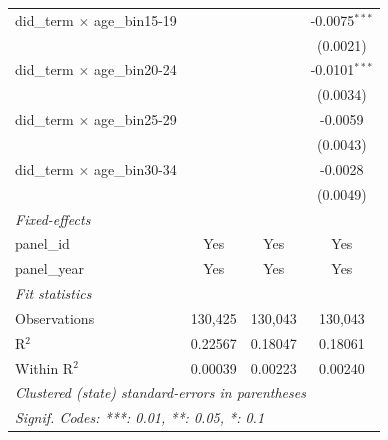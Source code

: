 \begin{tabular}{lccc}
   did\_term $\times$ age\_bin15-19    &          &                & -0.0075$^{***}$\\   
                                       &          &                & (0.0021)\\   
   did\_term $\times$ age\_bin20-24    &          &                & -0.0101$^{***}$\\   
                                       &          &                & (0.0034)\\   
   did\_term $\times$ age\_bin25-29    &          &                & -0.0059\\   
                                       &          &                & (0.0043)\\   
   did\_term $\times$ age\_bin30-34    &          &                & -0.0028\\   
                                       &          &                & (0.0049)\\   
   \midrule
   \emph{Fixed-effects}\\
   panel\_id                           & Yes      & Yes            & Yes\\  
   panel\_year                         & Yes      & Yes            & Yes\\  
   \midrule
   \emph{Fit statistics}\\
   Observations                        & 130,425  & 130,043        & 130,043\\  
   R$^2$                               & 0.22567  & 0.18047        & 0.18061\\  
   Within R$^2$                        & 0.00039  & 0.00223        & 0.00240\\  
   \midrule \midrule
   \multicolumn{4}{l}{\emph{Clustered (state) standard-errors in parentheses}}\\
   \multicolumn{4}{l}{\emph{Signif. Codes: ***: 0.01, **: 0.05, *: 0.1}}\\
\end{tabular}
\par\endgroup


